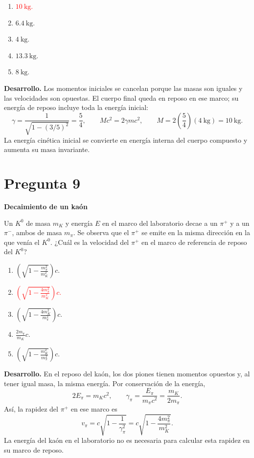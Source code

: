 \documentclass[a4paper,11pt]{article}
\newcommand{\pregunta}[2]{\section*{Pregunta #1}\textbf{#2}\par}
\begin{document}
\begin{enumerate}
    \item \textcolor{red}{$10\ \mathrm{kg}$.}
    \item $6.4\ \mathrm{kg}$.
    \item $4\ \mathrm{kg}$.
    \item $13.3\ \mathrm{kg}$.
    \item $8\ \mathrm{kg}$.
\end{enumerate}

\textbf{Desarrollo.} Los momentos iniciales se cancelan porque las masas son iguales y las velocidades son opuestas. El cuerpo final queda en reposo en ese marco; su energía de reposo incluye toda la energía inicial:
\[
\gamma=\frac{1}{\sqrt{1-(3/5)^2}}=\frac54,
\qquad Mc^2=2\gamma mc^2,
\qquad M=2\left(\frac54\right)(4\ \mathrm{kg})=10\ \mathrm{kg}.
\]
La energía cinética inicial se convierte en energía interna del cuerpo compuesto y aumenta su masa invariante.
\parencite[Sec. 5.2, pp. 132--138; Sec. 5.4, pp. 158--159]{chaparro2026}

\pregunta{9}{Decaimiento de un kaón}

Un $K^0$ de masa $m_K$ y energía $E$ en el marco del laboratorio decae a un $\pi^+$ y a un $\pi^-$, ambos de masa $m_\pi$. Se observa que el $\pi^+$ se emite en la misma dirección en la que venía el $K^0$. ¿Cuál es la velocidad del $\pi^+$ en el marco de referencia de reposo del $K^0$?

\begin{enumerate}[itemsep=0.3em]
    \item $\displaystyle \left(\sqrt{1-\frac{m_\pi^2}{m_K^2}}\right)c$.
    \item \textcolor{red}{$\displaystyle \left(\sqrt{1-\frac{4m_\pi^2}{m_K^2}}\right)c$.}
    \item $\displaystyle \left(\sqrt{1-\frac{4m_K^2}{m_\pi^2}}\right)c$.
    \item $\displaystyle \frac{2m_\pi}{m_K}c$.
    \item $\displaystyle \left(\sqrt{1-\frac{m_K^2}{m_\pi^2}}\right)c$.
\end{enumerate}

\begin{figure}[H]
\centering

\end{figure}

\textbf{Desarrollo.} En el reposo del kaón, los dos piones tienen momentos opuestos y, al tener igual masa, la misma energía. Por conservación de la energía,
\[
2E_\pi=m_Kc^2,
\qquad
\gamma_\pi=\frac{E_\pi}{m_\pi c^2}=\frac{m_K}{2m_\pi}.
\]
Así, la rapidez del $\pi^+$ en ese marco es
\[
v_\pi=c\sqrt{1-\frac{1}{\gamma_\pi^2}}
=c\sqrt{1-\frac{4m_\pi^2}{m_K^2}}.
\]
La energía del kaón en el laboratorio no es necesaria para calcular esta rapidez en su marco de reposo.
\parencite[Sec. 5.2, pp. 132--138; Sec. 5.4, pp. 158--159]{chaparro2026}
\end{document}
